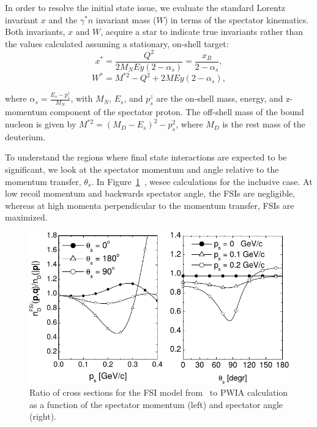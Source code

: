 In order to resolve the initial state issue, we evaluate the standard Lorentz 
invariant $x$ and the $\gamma^{*}n$ invariant mass ($W$) in terms of the 
spectator kinematics. Both invariants, $x$ and $W$, acquire a star to indicate  
true invariants rather than the values calculated assuming a stationary, 
on-shell target:
\begin{equation}
   x^* = \frac{Q^2}{2M_{N}Ey (2-\alpha_s)} = \frac{x_B}{2-\alpha_s},
\end{equation}
\begin{equation}
   W^* = M^{*2} - Q^2+ 2MEy(2-\alpha_s),
\end{equation}

where $\alpha_s = \frac{E_s - p^{z}_{s}}{M_N}$, with $M_N$, $E_s$, and 
$p^{z}_{s}$ are the on-shell mass, energy, and z-momentum component of the 
spectator proton. The off-shell mass of the bound nucleon is given by $M^{*2} = 
(M_D - E_s)^{2} - p^{2}_{s}$, where $M_D$ is the rest mass of the deuterium.

To understand the regions where final state interactions are expected to be 
significant, we look at the spectator momentum and angle relative to the 
momentum transfer, $\theta_s$.  In 
Figure~\ref{fig:deuteronFSI}~\cite{CiofidegliAtti:2003pb,CiofidegliAtti:2002as}, 
wesee calculations for the inclusive case.  At low recoil momentum and 
backwards spectator angle, the FSIs are negligible, whereas at high momenta 
perpendicular to the momentum transfer, FSIs are maximized.

\begin{figure}
   \centering
   \includegraphics{figures/FSI_quasielastic_Atti_2003.pdf}
   \caption{\label{fig:deuteronFSI} Ratio of cross sections for the FSI model 
   from~\cite{CiofidegliAtti:2003pb} to PWIA calculation as a function of
   the spectator momentum (left) and spectator angle (right).}
\end{figure}

